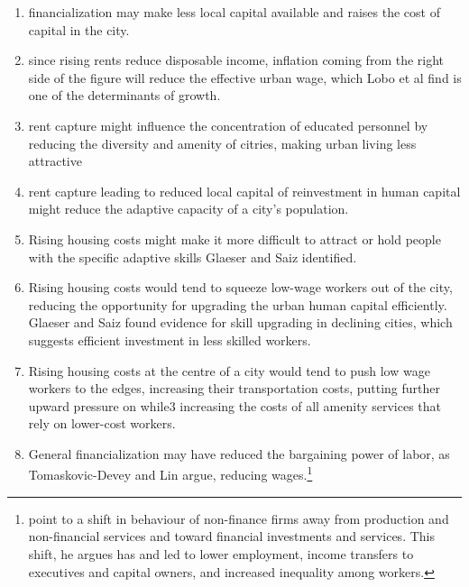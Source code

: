  
\begin{enumerate}
    \item financialization may make less local capital available and raises the cost of capital in the city. 
    
\item since rising rents reduce disposable income, inflation coming from the right  side of the figure will reduce  the effective urban wage, which Lobo et al find is one of the determinants of growth.

\item rent capture might influence the concentration of educated personnel by reducing the diversity and amenity of citries, making urban living less attractive 

\item rent capture leading to reduced local capital of reinvestment in human capital  might reduce the adaptive capacity of a city's population.

\item Rising housing costs might make it more difficult to attract or hold people with the specific adaptive skills Glaeser and Saiz identified.

\item  Rising housing costs would tend to squeeze low-wage workers out of the city, reducing the opportunity for upgrading the urban human capital efficiently. Glaeser and Saiz found   evidence for skill upgrading  in declining cities, which suggests efficient investment in less skilled workers. 

\item Rising housing costs at the centre of a city would tend to push low wage workers to the edges, increasing their transportation costs, putting further upward pressure on while3 increasing the costs of all amenity services that rely on lower-cost workers.

\item General financialization may have reduced the bargaining power of labor, as Tomaskovic-Devey and Lin \cite{tomaskovic-deveyFinancializationCausesInequality2013} argue, reducing wages.\footnote{point to a shift in behaviour of non-finance firms away from production and non-financial services and toward financial investments and services. This shift, he argues  has and led to lower employment, income transfers to executives and capital owners, and increased inequality among workers.\cite{tomaskovic-deveyFinancializationCausesInequality2013}}  

\end{enumerate}



